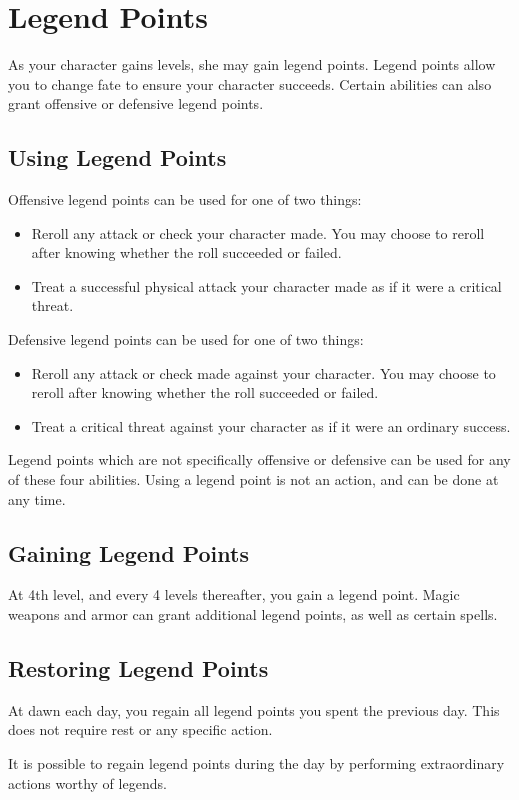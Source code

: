 \section{Legend Points}\label{Legend Points}

As your character gains levels, she may gain legend points. Legend points allow you to change fate to ensure your character succeeds. Certain abilities can also grant offensive or defensive legend points.

\subsection{Using Legend Points}

Offensive legend points can be used for one of two things:
\begin{itemize}
    \item Reroll any attack or check your character made. You may choose to reroll after knowing whether the roll succeeded or failed.
    \item Treat a successful physical attack your character made as if it were a critical threat.
\end{itemize}

Defensive legend points can be used for one of two things:
\begin{itemize}
    \item Reroll any attack or check made against your character. You may choose to reroll after knowing whether the roll succeeded or failed.
    \item Treat a critical threat against your character as if it were an ordinary success.
\end{itemize}

Legend points which are not specifically offensive or defensive can be used for any of these four abilities. Using a legend point is not an action, and can be done at any time.

\subsection{Gaining Legend Points}

At 4th level, and every 4 levels thereafter, you gain a legend point. Magic weapons and armor can grant additional legend points, as well as certain spells.

\subsection{Restoring Legend Points}

At dawn each day, you regain all legend points you spent the previous day. This does not require rest or any specific action.

It is possible to regain legend points during the day by performing extraordinary actions worthy of legends.
